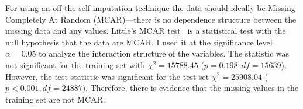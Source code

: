 For using an off-the-self imputation technique the data should ideally be Missing Completely At Random (MCAR)---there is no dependence structure between the missing data and any values. Little's MCAR test~\cite{little1988test} is a statistical test with the null hypothesis that the data are MCAR. I used it at the significance level $\alpha=0.05$ to analyze the interaction structure of the variables. The statistic was not significant for the training set with $\chi^2 = 15788.45$ ($p = 0.198, df=15639$).  However, the test statistic was significant for the test set $\chi^2 = 25908.04$ ($p < 0.001, df = 24887$). Therefore, there is evidence that the missing values in the training set are not MCAR.
